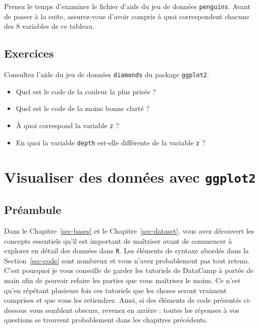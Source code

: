 \documentclass[
  letterpaper,
  DIV=11,
  numbers=noendperiod]{scrreprt}
\providecommand{\tightlist}{%
  \setlength{\itemsep}{0pt}\setlength{\parskip}{0pt}}\usepackage{longtable,booktabs,array}
\begin{document}
Prenez le temps d'examiner le fichier d'aide du jeu de données
\texttt{penguins}. Avant de passer à la suite, assurez-vous d'avoir
compris à quoi correspondent chacune des 8 variables de ce tableau.

\hypertarget{sec-Exo-2}{%
\section{Exercices}\label{sec-Exo-2}}

Consultez l'aide du jeu de données \texttt{diamonds} du package
\texttt{ggplot2}.

\begin{itemize}
\tightlist
\item
  Quel est le code de la couleur la plus prisée ?
\item
  Quel est le code de la moins bonne clarté ?
\item
  À quoi correspond la variable \texttt{z} ?
\item
  En quoi la variable \texttt{depth} est-elle différente de la variable
  \texttt{z} ?
\end{itemize}


\hypertarget{sec-viz}{%
\chapter{\texorpdfstring{Visualiser des données avec
\texttt{ggplot2}}{Visualiser des données avec ggplot2}}\label{sec-viz}}

\hypertarget{pruxe9ambule-2}{%
\section{Préambule}\label{pruxe9ambule-2}}

Dans le Chapitre~\ref{sec-bases} et le Chapitre~\ref{sec-dataset}, vous
avez découvert les concepts essentiels qu'il est important de maîtriser
avant de commencer à explorer en détail des données dans \texttt{R}. Les
éléments de syntaxe abordés dans la Section~\ref{sec-code} sont nombreux
et vous n'avez probablement pas tout retenu. C'est pourquoi je vous
conseille de garder les tutoriels de DataCamp à portée de main afin de
pouvoir refaire les parties que vous maîtrisez le moins. Ce n'est qu'en
répétant plusieurs fois ces tutoriels que les choses seront vraiment
comprises et que vous les retiendrez. Ainsi, si des éléments de code
présentés ci-dessous vous semblent obscurs, revenez en arrière : toutes
les réponses à vos questions se trouvent probablement dans les chapitres
précédents.
\end{document}
